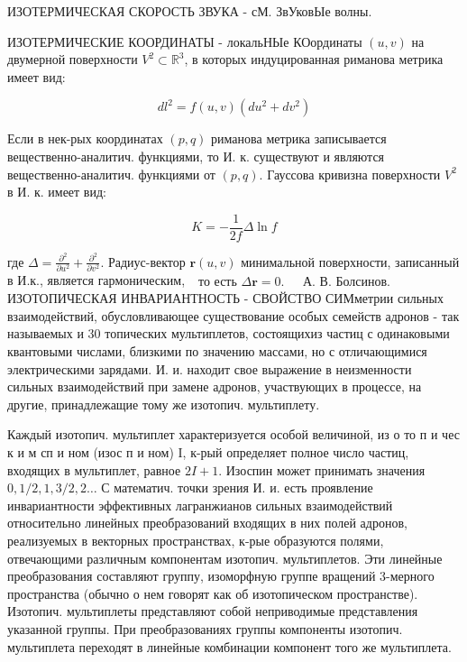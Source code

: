 \documentclass[10pt]{article}
\begin{document}
ИЗОТЕРМИЧЕСКАЯ СКОРОСТЬ ЗВУКА - сМ. ЗвУковЫе волны.



ИЗОТЕРМИЧЕСКИЕ КООРДИНАТЫ - локальНЫе КОординаты $(u, v)$ на двумерной поверхности $V^{2} \subset \mathbb{R}^{3}$, в которых индуцированная риманова метрика имеет вид:



\[

d l^{2}=f(u, v)\left(d u^{2}+d v^{2}\right)

\]



Если в нек-рых координатах $(p, q)$ риманова метрика записывается вещественно-аналитич. функциями, то И. к. существуют и являются вещественно-аналитич. функциями от $(p, q)$. Гауссова кривизна поверхности $V^{2}$ в И. к. имеет вид:



\[

K=-\frac{1}{2 f} \Delta \ln f

\]



где $\Delta=\frac{\partial^{2}}{\partial u^{2}}+\frac{\partial^{2}}{\partial v^{2}}$. Радиус-вектор $\boldsymbol{r}(u, v)$ минимальной поверхности, записанный в И.к., является гармоническим, $\begin{array}{ll}\text { то есть } \Delta \boldsymbol{r}=0 \text {. } & \text { А. В. Болсинов. }\end{array}$ ИЗОТОПИЧЕСКАЯ ИНВАРИАНТНОСТЬ - СВОЙСТВО СИМметрии сильных взаимодействий, обусловливающее существование особых семейств адронов - так называемых и 30 топических мультиплетов, состоящихиз частиц с одинаковыми квантовыми числами, близкими по значению массами, но с отличающимися электрическими зарядами. И. и. находит свое выражение в неизменности сильных взаимодействий при замене адронов, участвующих в процессе, на другие, принадлежащие тому же изотопич. мультиплету.



Каждый изотопич. мультиплет характеризуется особой величиной, из о то п и чес к и м сп и ном (изос п и ном) I, к-рый определяет полное число частиц, входящих в мультиплет, равное $2 I+1$. Изоспин может принимать значения $0,1 / 2,1,3 / 2,2 \ldots$ С математич. точки зрения И. и. есть проявление инвариантности эффективных лагранжианов сильных взаимодействий относительно линейных преобразований входящих в них полей адронов, реализуемых в векторных пространствах, к-рые образуются полями, отвечающими различным компонентам изотопич. мультиплетов. Эти линейные преобразования составляют группу, изоморфную группе вращений 3-мерного пространства (обычно о нем говорят как об изотопическом пространстве). Изотопич. мультиплеты представляют собой неприводимые представления указанной группы. При преобразованиях группы компоненты изотопич. мультиплета переходят в линейные комбинации компонент того же мультиплета.
\end{document}
